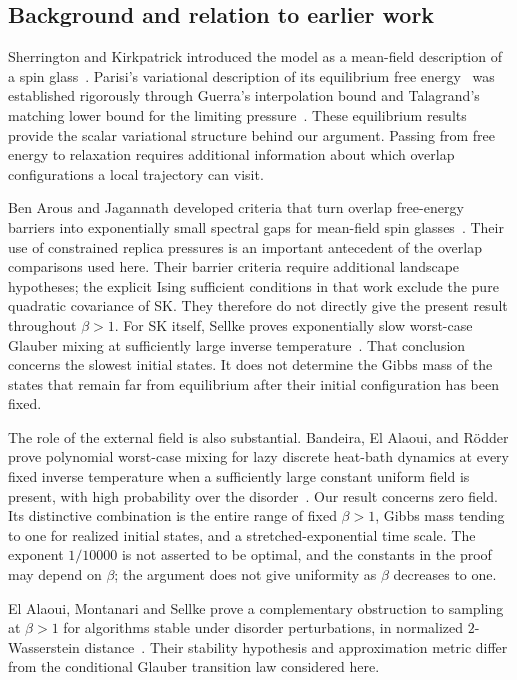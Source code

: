 \subsection{Background and relation to earlier work}

Sherrington and Kirkpatrick introduced the model as a mean-field
description of a spin glass~\cite{SK75}. Parisi's variational
description of its equilibrium free energy~\cite{Parisi80} was
established rigorously through Guerra's interpolation bound and
Talagrand's matching lower bound for the limiting
pressure~\cite{Guerra03,Talagrand06}.
These equilibrium results provide the scalar variational structure
behind our argument. Passing from free energy to relaxation requires
additional information about which overlap configurations a local
trajectory can visit.

Ben Arous and Jagannath developed criteria that turn overlap
free-energy barriers into exponentially small spectral gaps for
mean-field spin glasses~\cite{BAJ18}. Their use of constrained replica
pressures is an important antecedent of the overlap comparisons used
here. Their barrier criteria require additional landscape hypotheses;
the explicit Ising sufficient conditions in that work exclude the
pure quadratic covariance of SK. They therefore do not directly give
the present result throughout $\beta>1$.
For SK itself, Sellke proves exponentially slow worst-case Glauber
mixing at sufficiently large inverse
temperature~\cite[Theorem~1.1]{Sellke25}.
That conclusion concerns the slowest initial states. It does not
determine the Gibbs mass of the states that remain far from equilibrium
after their initial configuration has been fixed.

The role of the external field is also substantial. Bandeira,
El Alaoui, and R\"odder prove polynomial worst-case mixing for lazy
discrete heat-bath dynamics at every fixed inverse temperature when
a sufficiently large constant uniform field is present, with high
probability over the disorder~\cite[Corollary~1.2]{BER26}.
Our result concerns zero field. Its distinctive combination is the
entire range of fixed $\beta>1$, Gibbs mass tending to one for
realized initial states, and a stretched-exponential time scale.
The exponent $1/10000$ is not asserted to be optimal, and the constants
in the proof may depend on $\beta$; the argument does not give
uniformity as $\beta$ decreases to one.

El Alaoui, Montanari and Sellke prove a complementary obstruction to
sampling at $\beta>1$ for algorithms stable under disorder perturbations,
in normalized $2$-Wasserstein distance~\cite[Theorem~2.6]{AMS22}. Their stability
hypothesis and approximation metric differ from the conditional Glauber
transition law considered here.

